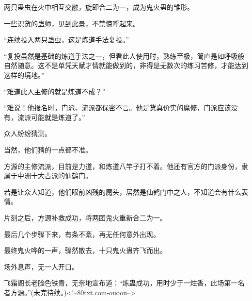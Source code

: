 \begin{this_body}
两只蛊虫在火中相互交融，旋即合二为一，成为鬼火蛊的雏形。

一些识货的蛊师，见到此景，不禁惊呼起来。

“连续投入两只蛊虫，这是炼道手法复投。”

“复投虽然是基础的炼道手法之一，但看此人使用时，熟练至极，简直是如呼吸般自然随意。这不是单凭天赋才情就能做到的，非得是无数次的练习苦修，才能达到这样的境地。”

“难道此人主修的就是炼道不成？”

“难说！他报名时，门派、流派都保密不言。他是货真价实的魔修，门派应该没有，流派可能就是炼道了。”

众人纷纷猜测。

当然，他们猜的一点都不准。

方源的主修流派，目前是力道，和炼道八竿子打不着。他还有官方的门派身份，隶属于中洲十大古派的仙鹤门。

若是让众人知道，他们眼前凶残的魔头，居然是仙鹤门中之人，不知道会有什么表情。

片刻之后，方源补救成功，将两团鬼火重新合二为一。

最后几个步骤下来，有条不紊，再无任何意外出现。

最终鬼火哗的一声，骤然散去，十只鬼火蛊齐飞而出。

场外息声，无一人开口。

飞霜阁长老脸色铁青，无奈地宣布道：“炼蛊成功，用时少于一炷香，此场第一名者方源。”(未完待续。)<!--80txt.com-ouoou-->

\end{this_body}

